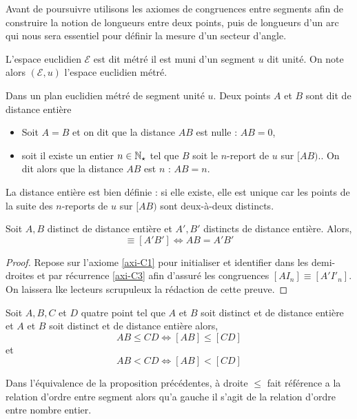 Avant de poursuivre utilisons les axiomes de congruences entre segments afin de construire la notion de longueurs entre deux points, puis de longueurs d'un arc qui nous sera essentiel pour définir la mesure d'un secteur d'angle.

\begin{defi}
    L'espace euclidien $\mathcal{E}$ est dit métré \ssi il est muni d'un segment $u$ dit unité. On note alors $(\mathcal{E},u)$ l'espace euclidien métré. 
\end{defi}
\begin{defi}
    Dans un plan euclidien métré de segment unité $u$. Deux points $A$ et $B$ sont dit de distance entière \ssi
    \begin{itemize}[$\bullet$]
        \item Soit $A=B$ et on dit que la distance $AB$ est nulle : $AB=0$,
        \item soit il existe un entier $n\in \mathbb{N}_\star$ tel que $B$ soit le $n$-report de $u$ sur $[AB)$.. On dit alors que la distance $AB$ est $n$ : $AB=n$. 
    \end{itemize}
\end{defi}
\begin{rema}
    La distance entière est bien définie : si elle existe, elle est unique car les points de la suite des $n$-reports de $u$ sur $[AB)$ sont deux-à-deux distincts.
\end{rema}
\begin{prop}
    Soit $A,B$ distinct de distance entière et $A',B'$ distincts de distance entière. Alors,
    \begin{equation*}
        [AB]\equiv[A'B'] \Longleftrightarrow AB = A'B'
    \end{equation*}
\begin{proof}
    Repose sur l'axiome \ref{axi-C1} pour initialiser et identifier dans les demi-droites et par récurrence \ref{axi-C3} afin d'assuré les congruences $[AI_n]\equiv[A'I'_n]$. On laissera lke lecteurs scrupuleux la rédaction de cette preuve.
\end{proof}
\end{prop}
\begin{prop}
    Soit $A,B,C$ et $D$ quatre point tel que $A$ et $B$ soit distinct et de distance entière et $A$ et $B$ soit distinct et de distance entière alors,
    \begin{equation*}
        AB \leq CD \Longleftrightarrow [AB]\leq[CD]
    \end{equation*}
    et 
    \begin{equation*}
        AB <CD \Longleftrightarrow [AB]<[CD]
    \end{equation*}
\end{prop}
\begin{rema}
    Dans l'équivalence de la proposition précédentes, à droite $\leq$ fait référence a la relation d'ordre entre segment alors qu'a gauche il s'agit de la relation d'ordre entre nombre entier.  
\end{rema}

